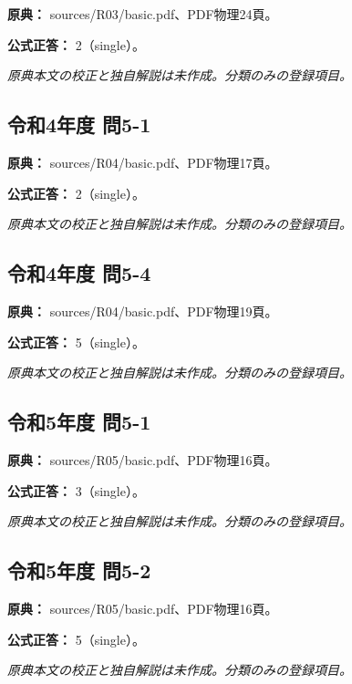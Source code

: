 \noindent\textbf{原典：} sources/R03/basic.pdf、PDF物理24頁。

\textbf{公式正答：} 2（single）。

\par\textit{原典本文の校正と独自解説は未作成。分類のみの登録項目。}

\subsection{令和4年度 問5-1}
\label{q:r04-reg-basic-5-1}

\noindent\textbf{原典：} sources/R04/basic.pdf、PDF物理17頁。

\textbf{公式正答：} 2（single）。

\par\textit{原典本文の校正と独自解説は未作成。分類のみの登録項目。}

\subsection{令和4年度 問5-4}
\label{q:r04-reg-basic-5-4}

\noindent\textbf{原典：} sources/R04/basic.pdf、PDF物理19頁。

\textbf{公式正答：} 5（single）。

\par\textit{原典本文の校正と独自解説は未作成。分類のみの登録項目。}

\subsection{令和5年度 問5-1}
\label{q:r05-reg-basic-5-1}

\noindent\textbf{原典：} sources/R05/basic.pdf、PDF物理16頁。

\textbf{公式正答：} 3（single）。

\par\textit{原典本文の校正と独自解説は未作成。分類のみの登録項目。}

\subsection{令和5年度 問5-2}
\label{q:r05-reg-basic-5-2}

\noindent\textbf{原典：} sources/R05/basic.pdf、PDF物理16頁。

\textbf{公式正答：} 5（single）。

\par\textit{原典本文の校正と独自解説は未作成。分類のみの登録項目。}

